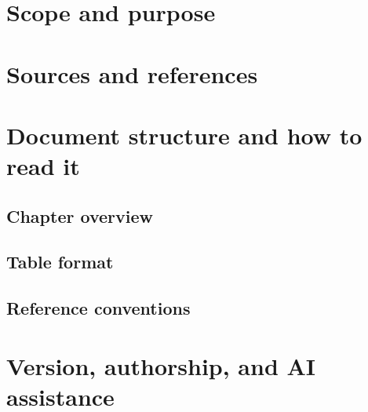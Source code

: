 \documentclass[11pt, a4paper, twoside]{report}
\begin{document}
\section{Scope and purpose}

\section{Sources and references}

\section{Document structure and how to read it}

\subsection{Chapter overview}

\subsection{Table format}

\subsection{Reference conventions}

\section{Version, authorship, and AI assistance}
\end{document}
